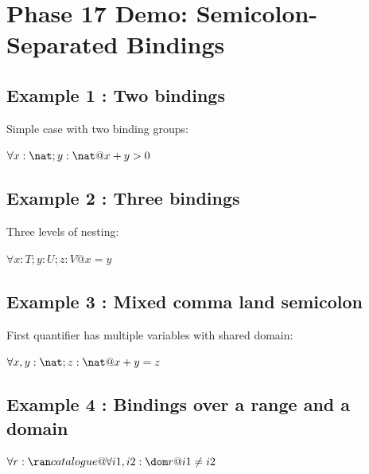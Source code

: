 \documentclass[a4paper,10pt,fleqn]{article}
\begin{document}
\section*{Phase 17 Demo: Semicolon-Separated Bindings}

\subsection*{Example 1 : Two bindings}

\noindent Simple case with two binding groups:

\bigskip

\noindent $\forall x : \nat; y : \nat @ x + y > 0$

\bigskip

\subsection*{Example 2 : Three bindings}

\noindent Three levels of nesting:

\bigskip

\noindent $\forall x : T; y : U; z : V @ x = y$

\bigskip

\subsection*{Example 3 : Mixed comma land semicolon}

\noindent First quantifier has multiple variables with shared domain:

\bigskip

\noindent $\forall x, y : \nat; z : \nat @ x + y = z$

\bigskip

\subsection*{Example 4 : Bindings over a range and a domain}

\noindent $\forall r : \ran catalogue @ \forall i1, i2 : \dom r @ i1 \neq i2$

\bigskip
\end{document}
